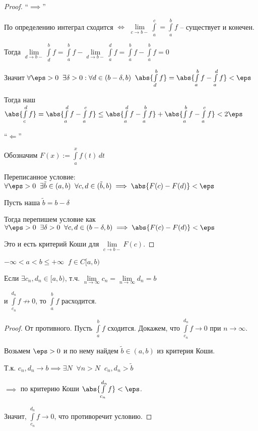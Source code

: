\begin{proof}\slashns
	
	``$\implies$''
	
	По определению интеграл сходится $\iff$ $\lim\limits_{c \to b-} \int\limits_a^c = \int\limits_a^b f$ -- существует и конечен.
	
	Тогда $\lim\limits_{d \to b-} \int\limits_d^b f = \int\limits_a^b f - \lim\limits_{d \to b-} \int\limits_a^d f = \int\limits_a^b f - \int\limits_a^b f = 0$
	
	Значит $\forall \eps > 0 \;\; \exists \delta > 0 : \forall d \in(b - \delta, b) \;\; \abs{\int\limits_d^b f} = \abs{\int\limits_a^b f - \int\limits_a^d f} < \eps$
	
	Тогда наш $ \abs{\int\limits_c^d f} = \abs{\int\limits_a^d f - \int\limits_a^c f} \le \abs{\int\limits_a^d f - \int\limits_a^b f} + \abs{\int\limits_a^b f - \int\limits_a^c f} < 2\eps$
	
	``$\Longleftarrow$''
	
	Обозначим $F(x) := \int\limits_a^x f(t) \, dt$
	
	Переписанное условие: $\forall \eps > 0 \;\;\exists \tilde{b} \in (a,b)\;\; \forall c, d \in (\tilde{b}, b) \implies \abs{F(c) - F(d)} < \eps$
	
	Пусть наша $\tilde{b} = b - \delta$
	
	Тогда перепишем условие как $\forall \eps > 0 \;\;\exists \delta > 0 \;\;\forall c, d \in (b- \delta, b) \implies \abs{F(c) - F(d)} < \eps$
	
	Это и есть критерий Коши для $\lim\limits_{c \to b-} F(c)$.
\end{proof}

\begin{consequence}\slashns
	
	$-\infty < a < b \le +\infty \;\; f \in C[a,b)$
	
	Если $\exists c_n, d_n \in[a,b)$, т.ч. $\lim\limits_{n \to \infty} c_n = \lim\limits_{n \to \infty} d_n = b$
	
	и $\int\limits_{c_n}^{d_n} f \not\to 0$, то $\int\limits_a^b f$ расходится.
	
\end{consequence}

\begin{proof}\slashns
	
	От противного. Пусть $\int\limits_a^b f$ сходится. Докажем, что $\int\limits_{c_n}^{d_n} f \to 0$ при $n \to \infty$.
	
	Возьмем $\eps > 0$ и по нему найдем $\tilde{b} \in (a,b)$ из критерия Коши.
	
	Т.к. $c_n, d_n \to b \implies \exists N \;\; \forall n > N \;\; c_n, d_n > \tilde{b}$
	
	$\implies$ по критерию Коши $\abs{\int\limits_{c_n}^{d_n} f} < \eps$.
	
	Значит, $\int\limits_{c_n}^{d_n} f \to 0$, что противоречит условию.
\end{proof}

